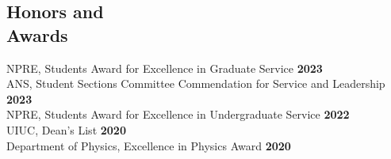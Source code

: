 \documentclass[margin,line]{resume}
\begin{document}
\begin{resume}
    \section{\mysidestyle Honors and\\Awards}
                NPRE, Students Award for Excellence in Graduate Service \hfill \textbf{2023}\vspace{.5mm}\\%
                ANS, Student Sections Committee Commendation for Service and Leadership \hfill \textbf{2023}\vspace{.5mm}\\%
                NPRE, Students Award for Excellence in Undergraduate Service \hfill \textbf{2022}\vspace{.5mm}\\%
                UIUC, Dean's List \hfill \textbf{2020}\vspace{.5mm}\\%
                Department of Physics, Excellence in Physics Award \hfill \textbf{2020}\vspace{.5mm}\\%



\end{resume}
\end{document}
